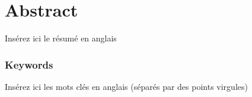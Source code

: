 
\chapter*{Abstract}%
\label{chap:abstract_en}

Insérez ici le résumé en anglais

\subsection*{Keywords}
Insérez ici les mots clés en anglais (séparés par des points virgules)


